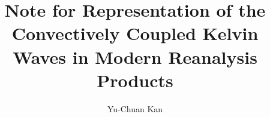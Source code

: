 \title{Note for Representation of the Convectively Coupled Kelvin Waves in Modern Reanalysis Products}
\author{Yu-Chuan Kan}
